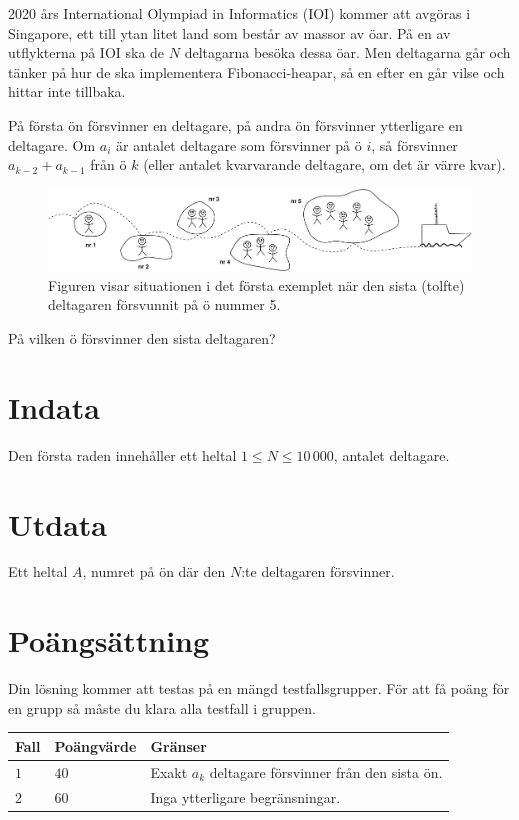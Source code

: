 2020 års International Olympiad in Informatics (IOI) kommer att avgöras i Singapore, ett till ytan litet land som består av massor av öar.
På en av utflykterna på IOI ska de $N$ deltagarna besöka dessa öar.
Men deltagarna går och tänker på hur de ska implementera Fibonacci-heapar, så en efter en går vilse och hittar inte tillbaka.

På första ön försvinner en deltagare, på andra ön försvinner ytterligare en deltagare.
Om $a_i$ är antalet deltagare som försvinner på ö $i$, så försvinner $a_{k-2} + a_{k-1}$ från ö $k$ (eller antalet kvarvarande deltagare, om det är värre kvar).

\begin{figure}[h]
  \centering
      \includegraphics[width=1.0\textwidth]{oarfig}
      \caption{Figuren visar situationen i det första exemplet när den sista (tolfte) deltagaren försvunnit på ö nummer 5.}
\end{figure}

På vilken ö försvinner den sista deltagaren?

\section*{Indata}
Den första raden innehåller ett heltal $1\le N \le 10\,000$, antalet deltagare.

\section*{Utdata}
Ett heltal $A$, numret på ön där den $N$:te deltagaren försvinner.

\section*{Poängsättning}
Din lösning kommer att testas på en mängd testfallsgrupper.
För att få poäng för en grupp så måste du klara alla testfall i gruppen.

\noindent
\begin{tabular}{| l | l | l |}
  \hline
  Fall & Poängvärde & Gränser \\ \hline
  $1$    & $40$        &  Exakt $a_k$ deltagare försvinner från den sista ön. \\ \hline 
  $2$    & $60$        &  Inga ytterligare begränsningar. \\ \hline
\end{tabular}

